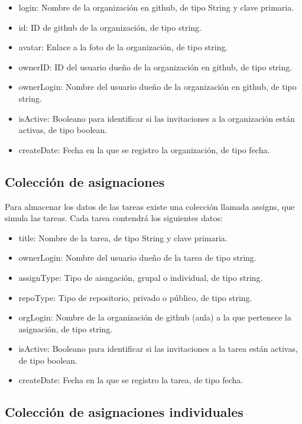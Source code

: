 \begin{itemize}
  \item login: Nombre de la organización en github, de tipo String y clave primaria.
  \item id: ID de github de la organización, de tipo string.
  \item avatar: Enlace a la foto de la organización, de tipo string.
  \item ownerID: ID del usuario dueño de la organización en github, de tipo string.
  \item ownerLogin: Nombre del usuario dueño de la organización en github, de tipo string.
  \item isActive: Booleano para identificar si las invitaciones a la organización están activas, de tipo boolean.
  \item createDate: Fecha en la que se registro la organización, de tipo fecha.
\end{itemize}

\subsection{Colección de asignaciones}
\label{3:4:3}

Para almacenar los datos de las tareas existe una colección llamada assigns, que simula las tareas. Cada tarea contendrá los siguientes datos:

\begin{itemize}
  \item title: Nombre de la tarea, de tipo String y clave primaria.
  \item ownerLogin: Nombre del usuario dueño de la tarea de tipo string.
  \item assignType: Tipo de aisngación, grupal o individual, de tipo string.
  \item repoType: Tipo de repositorio, privado o público, de tipo string.
  \item orgLogin: Nombre de la organización de github (aula) a la que pertenece la asignación, de tipo string.
  \item isActive: Booleano para identificar si las invitaciones a la tarea están activas, de tipo boolean.
  \item createDate: Fecha en la que se registro la tarea, de tipo fecha.
\end{itemize}

\subsection{Colección de asignaciones individuales}
\label{3:4:4}

